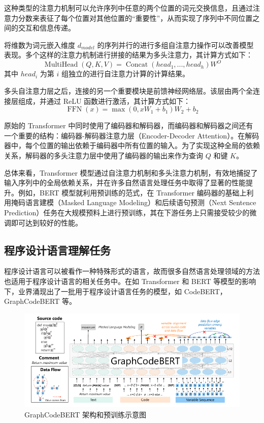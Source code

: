 这种类型的注意力机制可以允许序列中任意的两个位置的词元交换信息，且通过注意力分数来表征了每个位置对其他位置的“重要性”，从而实现了序列中不同位置之间的交互和信息传递。

将维数为词元嵌入维度 $ d_{model} $ 的序列并行的进行多组自注意力操作可以改善模型表现。多个这样的注意力机制进行拼接的结果为多头注意力，其计算方式如下：
$$
\operatorname{MultiHead}(Q, K, V) = \operatorname{Concat}(head_1, ..., head_h) W^{O}
$$
其中 $head_i$ 为第 $ i $ 组独立的进行自注意力计算的计算结果。

多头自注意力层之后，连接的另一个重要模块是前馈神经网络层。该层由两个全连接层组成，并通过 ReLU 函数进行激活，其计算方式如下：
$$
\operatorname{FFN}(x)= \max(0, x W_1 + b_1) W_2 + b_2
$$

原始的 Transformer 中同时使用了编码器和解码器，而编码器和解码器之间还有一个重要的结构：编码器-解码器注意力层（Encoder-Decoder Attention）。在解码器中，每个位置的输出依赖于编码器中所有位置的输入。为了实现这种全局的依赖关系，解码器的多头注意力层中使用了编码器的输出来作为查询 $Q$ 和键 $K$。

总体来看，Transformer 模型通过自注意力机制和多头注意力机制，有效地捕捉了输入序列中的全局依赖关系，并在许多自然语言处理任务中取得了显著的性能提升。例如，BERT \cite{devlin-etal-2019-bert} 模型就利用预训练的范式，在 Transformer 编码器的基础上利用掩码语言建模（Masked Language Modeling）和后续语句预测（Next Sentence Prediction）任务在大规模预料上进行预训练，其在下游任务上只需接受较少的微调即可达到较好的性能。

\subsection{程序设计语言理解任务}

程序设计语言可以被看作一种特殊形式的语言，故而很多自然语言处理领域的方法也适用于程序设计语言的相关任务中。在如 Transformer\cite{Vaswani2017AttentionIA} 和 BERT\cite{devlin-etal-2019-bert} 等模型的影响下，业界涌现出了一批用于程序设计语言任务的模型，如 CodeBERT\cite{feng-etal-2020-codebert}，GraphCodeBERT\cite{DBLP:conf/iclr/GuoRLFT0ZDSFTDC21} 等。

\begin{figure}
    \centering
    \includegraphics[width=1.0\linewidth]{figures/GraphCodeBERT-Crop.pdf}
    \caption{GraphCodeBERT 架构和预训练示意图\cite{DBLP:conf/iclr/GuoRLFT0ZDSFTDC21}}
    \label{fig:graphCodeBERT_arch_and_pretrain}
\end{figure}

